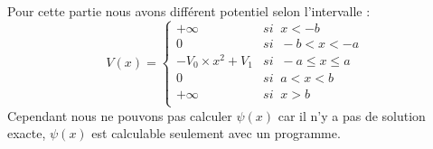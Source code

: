 \documentclass[11pt]{report}
\begin{document}
Pour cette partie nous avons différent potentiel selon l'intervalle :
\begin{equation}
V(x) = \begin{cases} 
+\infty & si \;\; x<-b \\
0 & si \;\; -b<x<-a \\
-V_0 \times x^2 + V_1 & si \;\; -a \leq x \leq a\\
0 & si \;\; a<x<b \\
+\infty & si \;\; x>b \\
\end{cases}
\end{equation}
Cependant nous ne pouvons pas calculer $\psi(x)$ car il n'y a pas de solution exacte, $\psi(x)$ est calculable seulement avec un programme.
\end{document}

